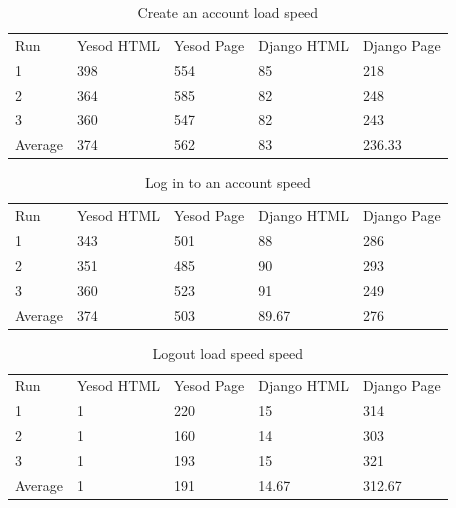 \begin{table}[H]
    \caption{Create an account load speed}
    \begin{center}
        \begin{tabular}{ | l | l | l | l | l |}
            \hline
            Run & Yesod HTML & Yesod Page & Django HTML & Django Page \\
            1 & 398 & 554 & 85 & 218 \\
            2 & 364 & 585 & 82 & 248 \\
            3 & 360 & 547 & 82 & 243 \\
            Average & 374 & 562 & 83 & 236.33 \\
            \hline
        \end{tabular}
    \end{center}
    \label{tab:signupCreateLoadSpeeds}
\end{table}

\begin{table}[H]
    \caption{Log in to an account speed}
    \begin{center}
        \begin{tabular}{ | l | l | l | l | l |}
            \hline
            Run & Yesod HTML & Yesod Page & Django HTML & Django Page \\
            1 & 343 & 501 & 88 & 286 \\
            2 & 351 & 485 & 90 & 293 \\
            3 & 360 & 523 & 91 & 249 \\
            Average & 374 & 503 & 89.67 & 276 \\
            \hline
        \end{tabular}
    \end{center}
    \label{tab:loginLoginLoadSpeeds}
\end{table}

\begin{table}[H]
    \caption{Logout load speed speed}
    \begin{center}
        \begin{tabular}{ | l | l | l | l | l |}
            \hline
            Run & Yesod HTML & Yesod Page & Django HTML & Django Page \\
            1 & 1 & 220 & 15 & 314 \\
            2 & 1 & 160 & 14 & 303 \\
            3 & 1 & 193 & 15 & 321 \\
            Average & 1 & 191 & 14.67 & 312.67 \\
            \hline
        \end{tabular}
    \end{center}
    \label{tab:logoutLoadSpeeds}
\end{table}


